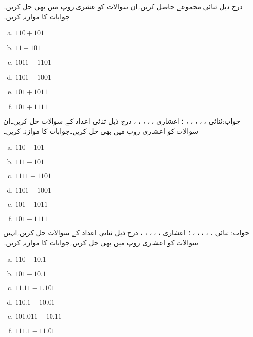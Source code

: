درج ذیل ثنائی مجموعے حاصل کریں۔ان سوالات کو عشری  روپ میں بھی حل کریں۔جوابات کا موازنہ کریں۔
\begin{multicols}{4}
\begin{enumerate}[a.]

\item  
 \(110+101\)  
\item 
 \(11+101\) 

\item  
 \(1011+1101\)  
\item 
 \(1101+1001\)   

\item  
 \(101+1011\)  
\item 
 \(101+1111\)  
\end{enumerate}
\end{multicols}
جواب:ثنائی ، ، ، ، ، ؛ 
اعشاری   ، ، ، ، ، 
درج ذیل ثنائی اعداد کے سوالات حل کریں۔ان سوالات کو اعشاری روپ میں بھی حل کریں۔جوابات کا موازنہ کریں۔
\begin{multicols}{4}
\begin{enumerate}[a.]

\item  
 \(110-101\)  
\item 
 \(111-101\) 

\item  
 \(1111-1101\)  
\item 
 \(1101-1001\)   

\item  
 \(101-1011\)  
\item 
 \(101-1111\)
\end{enumerate}
\end{multicols}
جواب: ثنائی  ، ، ،  ، ، ؛
 اعشاری  ، ، ، ،  ، 
درج ذیل ثنائی اعداد کے سوالات حل کریں۔انہیں سوالات کو اعشاری روپ میں بھی حل کریں۔جوابات کا موازنہ کریں۔
\begin{multicols}{4}
\begin{enumerate}[a.]
\item  
 \(110-10.1\)  
\item 
 \(101-10.1\) 

\item  
 \(11.11-1.101\)  
\item 
 \(110.1-10.01\)   

\item  
 \(101.011-10.11\) 
\item 
 \(111.1-11.01\)
\end{enumerate}
\end{multicols}
